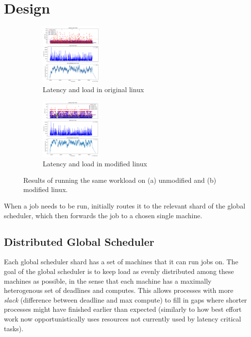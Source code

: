 \section{Design}

\begin{figure}[ht!]
    \centering
    \begin{subfigure}[t]{0.5\textwidth}
        \centering
        \includegraphics[height=1.2in]{img/old_lnx__2ms_wait__10K_iter.png}
        \caption{Latency and load in original linux}
    \end{subfigure}%
    \hfill
    \begin{subfigure}[t]{0.5\textwidth}
        \centering
        \includegraphics[height=1.2in]{img/new_lnx__2ms_wait__10K_iter.png}
        \caption{Latency and load in modified linux}
        \label{fig:graph:new}
    \end{subfigure}
    \vspace{10pt}
    \caption{Results of running the same workload on (a) unmodified and (b) modified linux.}
    \label{fig:graph}
\end{figure}

When a job needs to be run, \sysname{} initially routes it to the relevant shard
of the global scheduler, which then forwards the job to a chosen single machine.


\subsection*{Distributed Global Scheduler}

Each global scheduler shard has a set of machines that it can run jobs on. The
goal of the global scheduler is to keep load as evenly distributed among these
machines as possible, in the sense that each machine has a maximally
heterogenous set of deadlines and computes. This allows processes with more
\textit{slack} (difference between deadline and max compute) to fill in gaps
where shorter processes might have finished earlier than expected (similarly to
how best effort work now opportunistically uses resources not currently used by
latency critical tasks).

